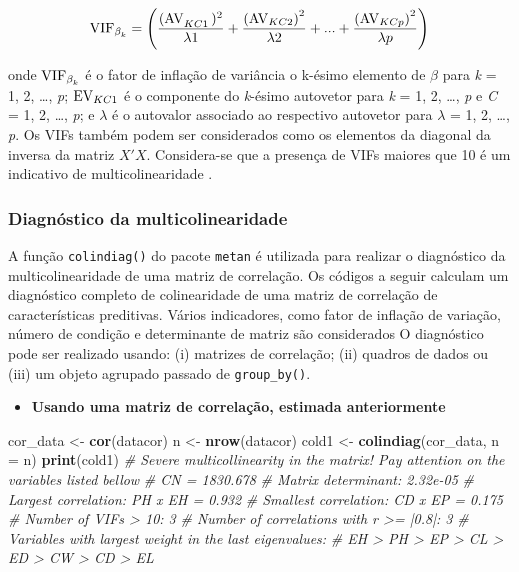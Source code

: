 \documentclass[
]{book}
\newenvironment{Shaded}{\begin{snugshade}}{\end{snugshade}}
\newcommand{\CommentTok}[1]{\textcolor[rgb]{0.56,0.35,0.01}{\textit{#1}}}
\newcommand{\DataTypeTok}[1]{\textcolor[rgb]{0.13,0.29,0.53}{#1}}
\newcommand{\KeywordTok}[1]{\textcolor[rgb]{0.13,0.29,0.53}{\textbf{#1}}}
\newcommand{\NormalTok}[1]{#1}
\newcommand{\StringTok}[1]{\textcolor[rgb]{0.31,0.60,0.02}{#1}}
\providecommand{\tightlist}{%
  \setlength{\itemsep}{0pt}\setlength{\parskip}{0pt}}
\begin{document}
\[
\mathop {{\rm{VIF}}}\nolimits_{\mathop \beta \nolimits_k }  = \left( {\frac{{\mathop {{\rm{(AV}}}\nolimits_{KC1} {)^2}}}{{\lambda 1}} + \frac{{{{(\mathop {{\rm{AV}}}\nolimits_{KC2} )}^2}}}{{\lambda 2}} + ... + \frac{{{{(\mathop {{\rm{AV}}}\nolimits_{KCp} )}^2}}}{{\lambda p}}} \right)
 \]

onde \(\mathop {{\rm{VIF}}}\nolimits_{\mathop \beta \nolimits_k }\) é o fator de inflação de variância o k-ésimo elemento de \(\beta\) para \emph{k} = 1, 2, \ldots, \emph{p}; \(\mathop {{\rm{EV}}}\nolimits_{KC{\rm{1}}}\) é o componente do \emph{k}-ésimo autovetor para \emph{k} = 1, 2, \ldots, \emph{p} e \emph{C} = 1, 2, \ldots, \emph{p}; e \(\lambda\) é o autovalor associado ao respectivo autovetor para \(\lambda\) = 1, 2, \ldots, \emph{p}. Os VIFs também podem ser considerados como os elementos da diagonal da inversa da matriz \(X'X\). Considera-se que a presença de VIFs maiores que 10 é um indicativo de multicolinearidade .

\hypertarget{diagnuxf3stico-da-multicolinearidade}{%
\subsubsection{Diagnóstico da multicolinearidade}\label{diagnuxf3stico-da-multicolinearidade}}

A função \texttt{colindiag()}  do pacote \texttt{metan} é utilizada para realizar o diagnóstico da multicolinearidade de uma matriz de correlação. Os códigos a seguir calculam um diagnóstico completo de colinearidade de uma matriz de correlação de características preditivas. Vários indicadores, como fator de inflação de variação, número de condição e determinante de matriz são considerados \citep{Olivoto2017f, Olivoto2017c} O diagnóstico pode ser realizado usando: (i) matrizes de correlação; (ii) quadros de dados ou (iii) um objeto agrupado passado de \texttt{group\_by()}.

\begin{itemize}
\tightlist
\item
  \textbf{Usando uma matriz de correlação, estimada anteriormente}
\end{itemize}

\begin{Shaded}
\begin{Highlighting}[]
\NormalTok{cor_data <-}\StringTok{ }\KeywordTok{cor}\NormalTok{(datacor)}
\NormalTok{n <-}\StringTok{ }\KeywordTok{nrow}\NormalTok{(datacor)}
\NormalTok{cold1 <-}\StringTok{ }\KeywordTok{colindiag}\NormalTok{(cor_data, }\DataTypeTok{n =}\NormalTok{ n)}
\KeywordTok{print}\NormalTok{(cold1)}
\CommentTok{# Severe multicollinearity in the matrix! Pay attention on the variables listed bellow}
\CommentTok{# CN = 1830.678}
\CommentTok{# Matrix determinant: 2.32e-05 }
\CommentTok{# Largest correlation: PH x EH = 0.932 }
\CommentTok{# Smallest correlation: CD x EP = 0.175 }
\CommentTok{# Number of VIFs > 10: 3 }
\CommentTok{# Number of correlations with r >= |0.8|: 3 }
\CommentTok{# Variables with largest weight in the last eigenvalues: }
\CommentTok{# EH > PH > EP > CL > ED > CW > CD > EL}
\end{Highlighting}
\end{Shaded}
\end{document}
